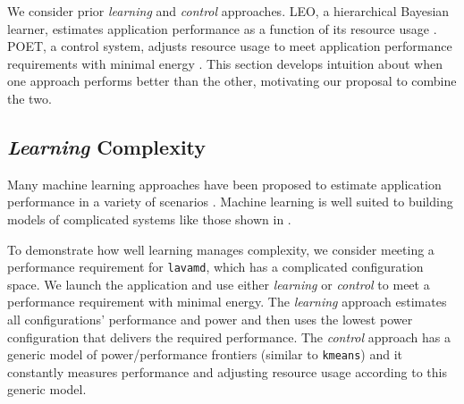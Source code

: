 
We consider prior \emph{learning} and \emph{control} approaches.  LEO,
a hierarchical Bayesian learner, estimates application performance as
a function of its resource usage \cite{LEO}. POET, a control system,
adjusts resource usage to meet application performance requirements
with minimal energy \cite{POET}.  This section develops intuition
about when one approach performs better than the other, motivating our
proposal to combine the two.

\subsection{\emph{Learning} Complexity}
Many machine learning approaches have been proposed to estimate
application performance in a variety of scenarios
\cite{reddiHPCA2013,LeeBrooks2006,CPR,ParallelismDial,Flicker,LeeBrooks,Koala}.
Machine learning is well suited to building models of complicated
systems like those shown in
.

To demonstrate how well learning manages complexity, we consider
meeting a performance requirement for \texttt{lavamd}, which has a
complicated configuration space.  We launch the application and use
either \emph{learning} or \emph{control} to meet a performance
requirement with minimal energy.  The \emph{learning} approach
estimates all configurations' performance and power and then uses the
lowest power configuration that delivers the required performance.
The \emph{control} approach has a generic model of power/performance
frontiers (similar to \texttt{kmeans}) and it constantly measures
performance and adjusting resource usage according to this generic
model.  

